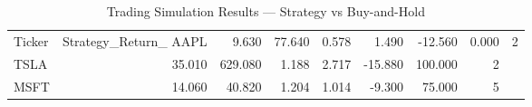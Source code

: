 \begin{table}[h]
\centering
\caption{Trading Simulation Results — Strategy vs Buy-and-Hold}
\label{tab:backtest}
\begin{tabular}{lrrrrrrr}
\hline
Ticker & Strategy_Return_%
\hline
AAPL & 9.630 & 77.640 & 0.578 & 1.490 & -12.560 & 0.000 & 2 \\
TSLA & 35.010 & 629.080 & 1.188 & 2.717 & -15.880 & 100.000 & 2 \\
MSFT & 14.060 & 40.820 & 1.204 & 1.014 & -9.300 & 75.000 & 5 \\
\hline
\end{tabular}
\end{table}